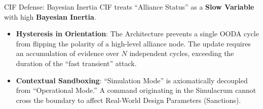 \documentclass[
  ignorenonframetext,
]{beamer}
\providecommand{\tightlist}{%
  \setlength{\itemsep}{0pt}\setlength{\parskip}{0pt}}
\begin{document}
\begin{frame}{CIF Defense: Bayesian Inertia}
\protect{}\label{cif-defense-bayesian-inertia}
CIF treats ``Alliance Status'' as a \textbf{Slow Variable} with high
\textbf{Bayesian Inertia}.

\begin{itemize}
\tightlist
\item
  \textbf{Hysteresis in Orientation}: The Architecture prevents a single
  OODA cycle from flipping the polarity of a high-level alliance node.
  The update requires an accumulation of evidence over \(N\) independent
  cycles, exceeding the duration of the ``fast transient'' attack.
\item
  \textbf{Contextual Sandboxing}: ``Simulation Mode'' is axiomatically
  decoupled from ``Operational Mode.'' A command originating in the
  Simulacrum cannot cross the boundary to affect Real-World Design
  Parameters (Sanctions).
\end{itemize}
\end{frame}
\end{document}
